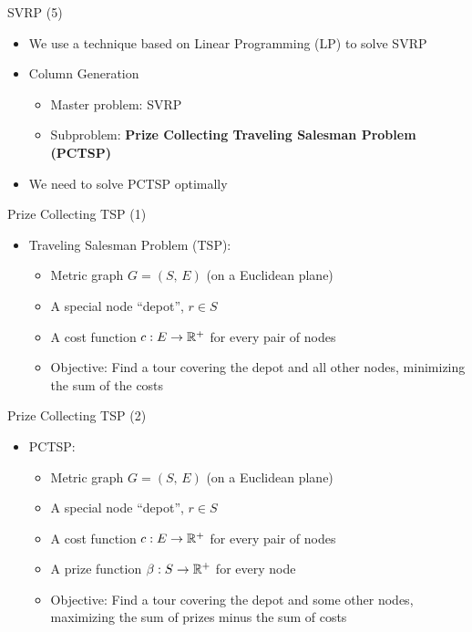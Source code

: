 \documentclass[10pt]{beamer}
\begin{document}
\begin{frame}[t]{SVRP (5)}
    \begin{itemize}
        \item<1-> We use a technique based on Linear Programming (LP) to solve SVRP
        \item<2-> \alert{Column Generation}
            \begin{itemize}
                \item<3-> Master problem: SVRP
                \item<4-> Subproblem: \textbf{Prize Collecting Traveling Salesman Problem (PCTSP)}
            \end{itemize}
        \item<5-> We need to solve PCTSP optimally
    \end{itemize}
\end{frame}

\begin{frame}[t]{Prize Collecting TSP (1)}
    \begin{itemize}
        \item<1-> Traveling Salesman Problem (TSP):
            \begin{itemize}
                \item<2-> Metric graph $G = (S, \, E)$ (on a Euclidean plane) 
                \item<3-> A special node ``depot'', $r \in S$
                \item<4-> A cost function $c:E \rightarrow \mathbb{R}^+$ for every pair of nodes        
                \item<5-> Objective: Find a tour covering the depot and \alert{all} other nodes, \alert{minimizing the sum of the costs}
            \end{itemize}
    \end{itemize}
\end{frame}

\begin{frame}[t]{Prize Collecting TSP (2)}
    \begin{itemize}
        \item<1-> PCTSP:
            \begin{itemize}
                \item<2-> Metric graph $G = (S, \, E)$ (on a Euclidean plane) 
                \item<2-> A special node ``depot'', $r \in S$
                \item<2-> A cost function $c:E \rightarrow \mathbb{R}^+$ for every pair of nodes
                \item<3-> A \alert{prize} function $\beta:S \rightarrow \mathbb{R}^+$ for every node
                \item<4-> Objective: Find a tour covering the depot and \alert{some} other nodes, \alert{maximizing the sum of prizes minus the sum of costs}
            \end{itemize}
    \end{itemize}
\end{frame}
\end{document}
